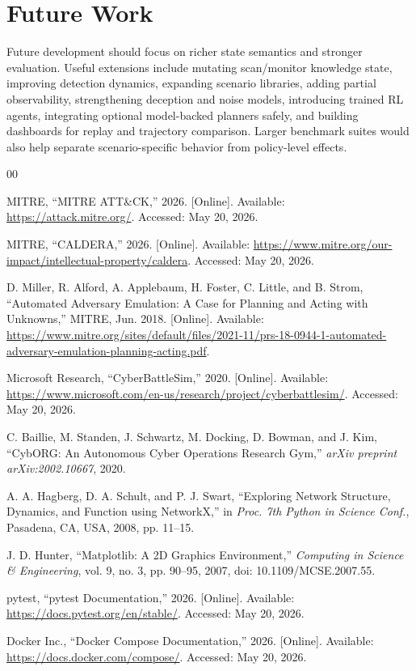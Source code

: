\documentclass[conference]{IEEEtran}
\begin{document}
\section{Future Work}
Future development should focus on richer state semantics and stronger evaluation. Useful extensions include mutating scan/monitor knowledge state, improving detection dynamics, expanding scenario libraries, adding partial observability, strengthening deception and noise models, introducing trained RL agents, integrating optional model-backed planners safely, and building dashboards for replay and trajectory comparison. Larger benchmark suites would also help separate scenario-specific behavior from policy-level effects.

\begin{thebibliography}{00}

MITRE, ``MITRE ATT\&CK,'' 2026. [Online]. Available: \url{https://attack.mitre.org/}. Accessed: May 20, 2026.

MITRE, ``CALDERA,'' 2026. [Online]. Available: \url{https://www.mitre.org/our-impact/intellectual-property/caldera}. Accessed: May 20, 2026.

D. Miller, R. Alford, A. Applebaum, H. Foster, C. Little, and B. Strom, ``Automated Adversary Emulation: A Case for Planning and Acting with Unknowns,'' MITRE, Jun. 2018. [Online]. Available: \url{https://www.mitre.org/sites/default/files/2021-11/prs-18-0944-1-automated-adversary-emulation-planning-acting.pdf}.

Microsoft Research, ``CyberBattleSim,'' 2020. [Online]. Available: \url{https://www.microsoft.com/en-us/research/project/cyberbattlesim/}. Accessed: May 20, 2026.

C. Baillie, M. Standen, J. Schwartz, M. Docking, D. Bowman, and J. Kim, ``CybORG: An Autonomous Cyber Operations Research Gym,'' \textit{arXiv preprint arXiv:2002.10667}, 2020.

A. A. Hagberg, D. A. Schult, and P. J. Swart, ``Exploring Network Structure, Dynamics, and Function using NetworkX,'' in \textit{Proc. 7th Python in Science Conf.}, Pasadena, CA, USA, 2008, pp. 11--15.

J. D. Hunter, ``Matplotlib: A 2D Graphics Environment,'' \textit{Computing in Science \& Engineering}, vol. 9, no. 3, pp. 90--95, 2007, doi: 10.1109/MCSE.2007.55.

pytest, ``pytest Documentation,'' 2026. [Online]. Available: \url{https://docs.pytest.org/en/stable/}. Accessed: May 20, 2026.

Docker Inc., ``Docker Compose Documentation,'' 2026. [Online]. Available: \url{https://docs.docker.com/compose/}. Accessed: May 20, 2026.

\end{thebibliography}
\end{document}

